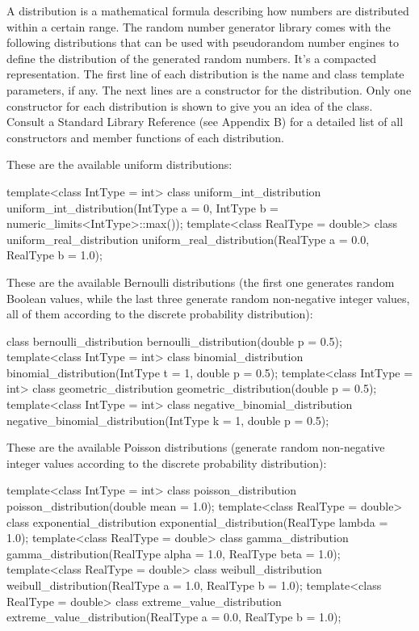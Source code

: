 A distribution is a mathematical formula describing how numbers are distributed within a certain range. The random number generator library comes with the following distributions that can be used with pseudorandom number engines to define the distribution of the generated random numbers. It’s a compacted representation. The first line of each distribution is the name and class template parameters, if any. The next lines are a constructor for the distribution. Only one constructor for each distribution is shown to give you an idea of the class. Consult a Standard Library Reference (see Appendix B) for a detailed list of all constructors and member functions of each distribution.

These are the available uniform distributions:

\begin{cpp}
template<class IntType = int> class uniform_int_distribution
    uniform_int_distribution(IntType a = 0,
                             IntType b = numeric_limits<IntType>::max());
template<class RealType = double> class uniform_real_distribution
    uniform_real_distribution(RealType a = 0.0, RealType b = 1.0);
\end{cpp}

These are the available Bernoulli distributions (the first one generates random Boolean values, while the last three generate random non-negative integer values, all of them according to the discrete probability distribution):

\begin{cpp}
class bernoulli_distribution
    bernoulli_distribution(double p = 0.5);
template<class IntType = int> class binomial_distribution
    binomial_distribution(IntType t = 1, double p = 0.5);
template<class IntType = int> class geometric_distribution
    geometric_distribution(double p = 0.5);
template<class IntType = int> class negative_binomial_distribution
    negative_binomial_distribution(IntType k = 1, double p = 0.5);
\end{cpp}

These are the available Poisson distributions (generate random non-negative integer values according to the discrete probability distribution):

\begin{cpp}
template<class IntType = int> class poisson_distribution
    poisson_distribution(double mean = 1.0);
template<class RealType = double> class exponential_distribution
    exponential_distribution(RealType lambda = 1.0);
template<class RealType = double> class gamma_distribution
    gamma_distribution(RealType alpha = 1.0, RealType beta = 1.0);
template<class RealType = double> class weibull_distribution
    weibull_distribution(RealType a = 1.0, RealType b = 1.0);
template<class RealType = double> class extreme_value_distribution
    extreme_value_distribution(RealType a = 0.0, RealType b = 1.0);
\end{cpp}

